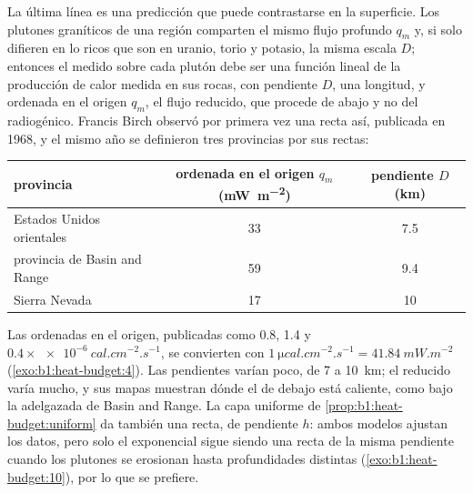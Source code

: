 La última línea es una predicción que puede contrastarse en la superficie. Los plutones graníticos de una región comparten el mismo
flujo profundo $q_m$ y, si solo difieren en lo ricos que son en uranio, torio y potasio, la misma escala $D$; entonces el 
medido sobre cada plutón debe ser una función lineal de la producción de calor medida en sus rocas, con pendiente $D$, una longitud,
y ordenada en el origen $q_m$, el flujo reducido, que procede de abajo y no del radiogénico.
Francis Birch observó por primera vez una recta así, publicada en 1968, y el mismo año se definieron tres provincias por sus rectas:
\begin{center}
\small
\begin{tabular}{lcc}
\hline
provincia & ordenada en el origen $q_m$ (\unit{mW.m^{-2}}) & pendiente $D$ (\unit{km}) \\
\hline
Estados Unidos orientales & 33 & 7.5 \\
provincia de Basin and Range & 59 & 9.4 \\
Sierra Nevada & 17 & 10 \\
\hline
\end{tabular}
\end{center}
Las ordenadas en el origen, publicadas como 0.8, 1.4 y $0.4\times\qty{e-6}{cal.cm^{-2}.s^{-1}}$, se convierten con
$\qty{1}{\micro cal.cm^{-2}.s^{-1}} = \qty{41.84}{mW.m^{-2}}$ (\cref{exo:b1:heat-budget:4}). Las pendientes varían poco, de 7 a
\qty{10}{km}; el  reducido varía mucho, y sus mapas muestran dónde el  de debajo está caliente, como bajo la
 adelgazada de Basin and Range. La capa uniforme de \cref{prop:b1:heat-budget:uniform} da también una recta, de pendiente
$h$: ambos modelos ajustan los datos, pero solo el exponencial sigue siendo una recta de la misma pendiente cuando los plutones se
erosionan hasta profundidades distintas (\cref{exo:b1:heat-budget:10}), por lo que se prefiere.

